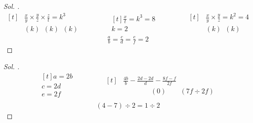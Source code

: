 \documentclass{article}
\theoremstyle{mytheoremstyle}
\theoremstyle{mytheoremstyle}
\theoremstyle{myproblemstyle}
\begin{document}
\begin{proof}[\textit{ Sol. }]
  \begin{equation*}
    \begin{aligned}[t]
      &\frac{x}{y} \times \frac{y}{z} \times \frac{z}{t} = k^3\\
      &(k)\;\ (k)\;\ (k)
    \end{aligned}
    \qquad\qquad
    \begin{aligned}[t]
      \frac{x}{t} = k^3 = 8\\
      k = 2
    \end{aligned}
    \qquad\qquad
    \begin{aligned}[t]
      &\frac{x}{y} \times \frac{y}{z} = k^2 = 4\\
      &(k)\;\ (k)
    \end{aligned}
  \end{equation*}
  \begin{align*}
    \frac{a}{b} = \frac{c}{d} = \frac{e}{f} = 2
  \end{align*}
\end{proof}

\begin{problem}[$ \frac{a + 2b}{b} - \frac{c - 2d}{d} - \frac{4e - f}{e} = ? $]
\end{problem}

\begin{proof}[\textit{ Sol. }]
  \begin{equation*}
    \begin{aligned}[t]
      a = 2b\\
      c = 2d\\
      e = 2f\\
    \end{aligned}
    \qquad\qquad
    \begin{aligned}[t]
      &\frac{4b}{b} - \frac{2d - 2d}{d} - \frac{8f - f}{2f}\\
      &\qquad\qquad\!\!\!(0)\qquad\! (7f \div 2f)
    \end{aligned}
  \end{equation*}
  \begin{align*}
    (4 - 7) \div 2 = 1 \div 2
  \end{align*}
\end{proof}

\begin{problem}[$ \frac{z}{y} = \frac{z}{t} = \frac{m}{n} = \frac{3}{5} $, $ 2x - z + 3m = 18 $, $ 2y + 3n = 34 $, $ t = ? $]
\end{problem}
\end{document}
